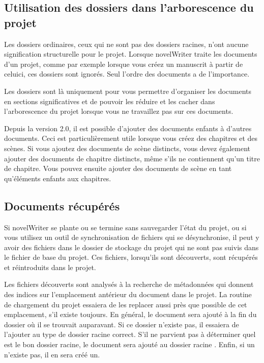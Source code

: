 \documentclass[a4paper,11pt,french]{sphinxmanual}
\begin{document}
\subsection{Utilisation des dossiers dans l’arborescence du projet}
\label{\detokenize{project_overview:using-folders-in-the-project-tree}}\label{\detokenize{project_overview:a-proj-roots-dirs}}
\sphinxAtStartPar
Les dossiers ordinaires, ceux qui ne sont pas des dossiers racines, n’ont aucune signification structurelle pour le projet. Lorsque novelWriter traite les documents d’un projet, comme par exemple lorsque vous créez un manuscrit à partir de celui\sphinxhyphen{}ci, ces dossiers sont ignorés. Seul l’ordre des documents a de l’importance.

\sphinxAtStartPar
Les dossiers sont là uniquement pour vous permettre d’organiser les documents en sections significatives et de pouvoir les réduire et les cacher dans l’arborescence du projet lorsque vous ne travaillez pas sur ces documents.

\sphinxAtStartPar
{}Depuis la version 2.0, il est possible d’ajouter des documents enfants à d’autres documents. Ceci est particulièrement utile lorsque vous créez des chapitres et des scènes. Si vous ajoutez des documents de scène distincts, vous devez également ajouter des documents de chapitre distincts, même s’ils ne contiennent qu’un titre de chapitre. Vous pouvez ensuite ajouter des documents de scène en tant qu’éléments enfants aux chapitres.


\subsection{Documents récupérés}
\label{\detokenize{project_overview:recovered-documents}}\label{\detokenize{project_overview:a-proj-roots-orphaned}}
\sphinxAtStartPar
Si novelWriter se plante ou se termine sans sauvegarder l’état du projet, ou si vous utilisez un outil de synchronisation de fichiers qui se désynchronise, il peut y avoir des fichiers dans le dossier de stockage du projet qui ne sont pas suivis dans le fichier de base du projet. Ces fichiers, lorsqu’ils sont découverts, sont récupérés et réintroduits dans le projet.

\sphinxAtStartPar
Les fichiers découverts sont analysés à la recherche de métadonnées qui donnent des indices sur l’emplacement antérieur du document dans le projet. La routine de chargement du projet essaiera de les replacer aussi près que possible de cet emplacement, s’il existe toujours. En général, le document sera ajouté à la fin du dossier où il se trouvait auparavant. Si ce dossier n’existe pas, il essaiera de l’ajouter au type de dossier racine correct. S’il ne parvient pas à déterminer quel est le bon dossier racine, le document sera ajouté au dossier racine . Enfin, si un  n’existe pas, il en sera créé un.
\end{document}
